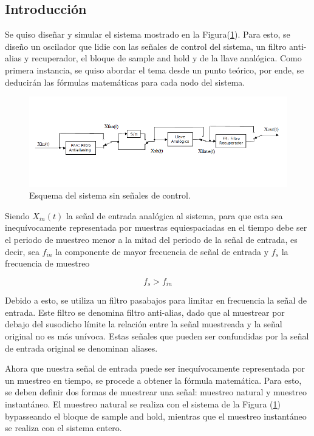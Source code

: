 



\subsection{Introducción}

Se quiso diseñar y simular el sistema mostrado en la Figura(\ref{fig:sist}). Para esto, se diseño un oscilador que lidie con las señales de control del sistema, un filtro anti-alias y recuperador, el bloque de sample and hold y de la llave analógica. Como primera instancia, se quiso abordar el tema desde un punto teórico, por ende, se deducirán las fórmulas matemáticas para cada nodo del sistema.

\begin{figure}[H]
	\centering
	\includegraphics[width=\textwidth]{ImagenesEjercicio1/sistema.png}
\caption{Esquema del sistema sin señales de control.}
	\label{fig:sist}
\end{figure}

Siendo $X_{in}(t)$ la señal de entrada analógica al sistema, para que esta sea inequívocamente representada por muestras equiespaciadas en el tiempo debe ser el periodo de muestreo menor a la mitad del periodo de la señal de entrada, es decir, sea $f_{in}$ la componente de mayor frecuencia de señal de entrada y $f_s$ la frecuencia de muestreo

\begin{equation}
f_{s} > f_{in}
\end{equation}

Debido a esto, se utiliza un filtro pasabajos para limitar en frecuencia la señal de entrada. Este filtro se denomina filtro anti-alias, dado que al muestrear por debajo del susodicho límite la relación entre la señal muestreada y la señal original no es más unívoca. Estas señales que pueden ser confundidas por la señal de entrada original se denominan aliases.


Ahora que nuestra señal de entrada puede ser inequívocamente representada por un muestreo en tiempo, se procede a obtener la fórmula matemática. Para esto, se deben definir dos formas de muestrear una señal: muestreo natural y muestreo instantáneo. El muestreo natural se realiza con el sistema de la Figura (\ref{fig:sist}) bypasseando el bloque de sample and hold, mientras que el muestreo instantáneo se realiza con el sistema entero.

